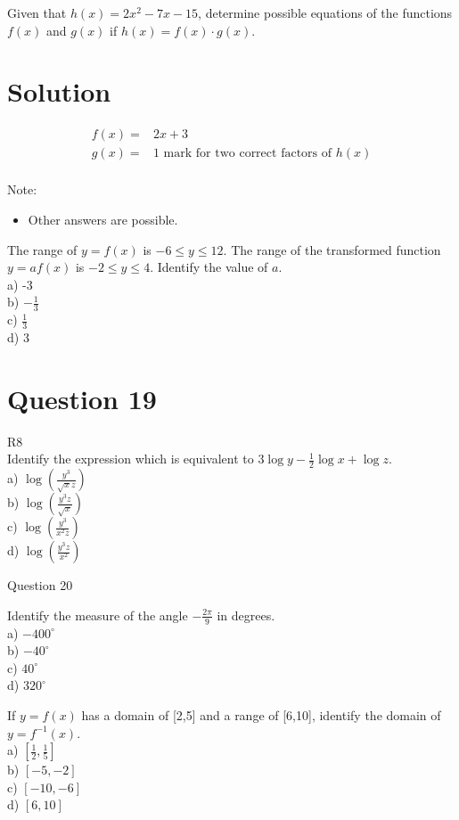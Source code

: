 \documentclass[10pt]{article}
\begin{document}
Given that $h(x)=2 x^{2}-7 x-15$, determine possible equations of the functions $f(x)$ and $g(x)$ if $h(x)=f(x) \cdot g(x)$.

\section*{Solution}
$$
\begin{array}{ll}
f(x)= & 2 x+3 \\
g(x)= & 1 \text { mark for two correct factors of } h(x) \\
&
\end{array}
$$

Note:

\begin{itemize}
  \item Other answers are possible.
\end{itemize}

The range of $y=f(x)$ is $-6 \leq y \leq 12$. The range of the transformed function $y=a f(x)$ is $-2 \leq y \leq 4$. Identify the value of $a$.\\
a) -3\\
b) $-\frac{1}{3}$\\
c) $\frac{1}{3}$\\
d) 3

\section*{Question 19}
R8\\
Identify the expression which is equivalent to $3 \log y-\frac{1}{2} \log x+\log z$.\\
a) $\log \left(\frac{y^{3}}{\sqrt{x} z}\right)$\\
b) $\log \left(\frac{y^{3} z}{\sqrt{x}}\right)$\\
c) $\log \left(\frac{y^{3}}{x^{2} z}\right)$\\
d) $\log \left(\frac{y^{3} z}{x^{2}}\right)$

Question 20

Identify the measure of the angle $-\frac{2 \pi}{9}$ in degrees.\\
a) $-400^{\circ}$\\
b) $-40^{\circ}$\\
c) $40^{\circ}$\\
d) $320^{\circ}$

If $y=f(x)$ has a domain of [2,5] and a range of [6,10], identify the domain of $y=f^{-1}(x)$.\\
a) $\left[\frac{1}{2}, \frac{1}{5}\right]$\\
b) $[-5,-2]$\\
c) $[-10,-6]$\\
d) $[6,10]$
\end{document}
